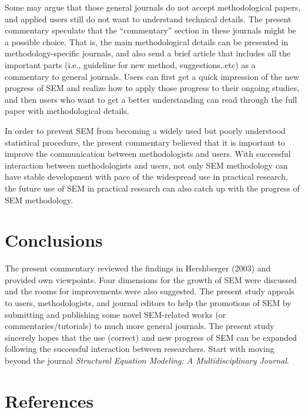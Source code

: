 \documentclass[jou]{apa6}
\theoremstyle{definition}
\theoremstyle{definition}
\theoremstyle{definition}
\theoremstyle{remark}
\begin{document}
Some may argue that those general journals do not accept methodological
papers, and applied users still do not want to understand technical
details. The present commentary speculate that the \enquote{commentary}
section in these journals might be a possible choice. That is, the main
methodological details can be presented in methodology-specific
journals, and also send a brief article that includes all the important
parts (i.e., guideline for new method, suggestions..etc) as a commentary
to general journals. Users can first get a quick impression of the new
progress of SEM and realize how to apply those progress to their ongoing
studies, and then users who want to get a better understanding can read
through the full paper with methodological details.

In order to prevent SEM from becoming a widely used but poorly
understood statistical procedure, the present commentary believed that
it is important to improve the communication between methodologists and
users. With successful interaction between methodologists and users, not
only SEM methodology can have stable development with pace of the
widespread use in practical research, the future use of SEM in practical
research can also catch up with the progress of SEM methodology.

\hypertarget{conclusions}{%
\section{Conclusions}\label{conclusions}}

\noindent The present commentary reviewed the findings in Hershberger
(2003) and provided own viewpoints. Four dimensions for the growth of
SEM were discussed and the rooms for improvements were also suggested.
The present study appeals to users, methodologists, and journal editors
to help the promotions of SEM by submitting and publishing some novel
SEM-related works (or commentaries/tutorials) to much more general
journals. The present study sincerely hopes that the use (correct) and
new progress of SEM can be expanded following the successful interaction
between researchers. Start with moving beyond the journal
\emph{Structural Equation Modeling: A Multidisciplinary Journal}.

\hypertarget{references}{%
\section{References}\label{references}}

\setlength{\parindent}{-0.5in}
\setlength{\leftskip}{0.5in}
\end{document}
